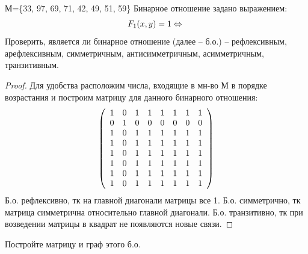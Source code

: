 \begin{problem}
    
    М=\{33, 97, 69, 71, 42, 49, 51, 59\}\newline
	Бинарное отношение задано выражением: \newline
   $$ F_{1}(x,y)=1\Leftrightarrow\newline$$
 \newline
 Проверить, является ли бинарное отношение (далее -- б.о.) -- рефлексивным, арефлексивным, симметричным, антисимметричным, асимметричным, транзитивным.
\end{problem}

\begin{proof}
    Для удобства расположим числа, входящие в мн-во М в порядке возрастания и построим матрицу для данного бинарного отношения:
	$$ \left( \begin{array}{c c c c c c c c } 
 
 1 & 0 & 1 & 1 & 1 & 1 & 1 & 1 \\ 

 0 & 1 & 0 & 0 & 0 & 0 & 0 & 0 \\

 1 & 0 & 1 & 1 & 1 & 1 & 1 & 1 \\ 
 
 1 & 0 & 1 & 1 & 1 & 1 & 1 & 1 \\ 
 
 1 & 0 & 1 & 1 & 1 & 1 & 1 & 1 \\ 
 
 1 & 0 & 1 & 1 & 1 & 1 & 1 & 1 \\ 
 
 1 & 0 & 1 & 1 & 1 & 1 & 1 & 1 \\ 
 
 1 & 0 & 1 & 1 & 1 & 1 & 1 & 1  \end {array} \right) $$
 Б.о. рефлексивно, тк на главной диагонали матрицы все 1.
    \newline
     Б.о. симметрично, тк матрица симметрична относительно главной диагонали.
    \newline
    Б.о. транзитивно, тк при возведении матрицы в квадрат не появляются новые связи.
     \newline

\end{proof}

\begin{problem}
	Постройте матрицу и граф этого б.о.
\end{problem}

